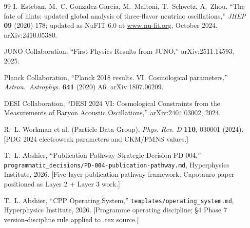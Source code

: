 \documentclass[11pt,letterpaper]{article}
\begin{document}
\begin{thebibliography}{99}
 I.~Esteban, M.~C. Gonzalez-Garcia, M.~Maltoni, T.~Schwetz, A.~Zhou, ``The fate of hints: updated global analysis of three-flavor neutrino oscillations,'' \textit{JHEP} \textbf{09} (2020) 178; updated as NuFIT 6.0 at \url{www.nu-fit.org}, October 2024. arXiv:2410.05380.

 JUNO Collaboration, ``First Physics Results from JUNO,'' arXiv:2511.14593, 2025.

 Planck Collaboration, ``Planck 2018 results. VI. Cosmological parameters,'' \textit{Astron.~Astrophys.} \textbf{641} (2020) A6. arXiv:1807.06209.

 DESI Collaboration, ``DESI 2024 VI: Cosmological Constraints from the Measurements of Baryon Acoustic Oscillations,'' arXiv:2404.03002, 2024.

 R.~L. Workman et al. (Particle Data Group), \textit{Phys. Rev. D} \textbf{110}, 030001 (2024). [PDG 2024 electroweak parameters and CKM/PMNS values.]

%

 T.~L. Abshier, ``Publication Pathway Strategic Decision PD-004,'' \texttt{programmatic\_decisions/PD-004-publication-pathway.md}, Hyperphysics Institute, 2026. [Five-layer publication-pathway framework; Capotauro paper positioned as Layer 2 + Layer 3 work.]

 T.~L. Abshier, ``CPP Operating System,'' \texttt{templates/operating\_system.md}, Hyperphysics Institute, 2026. [Programme operating discipline; \S 4 Phase 7 version-discipline rule applied to .tex source.]

\end{thebibliography}
\end{document}
